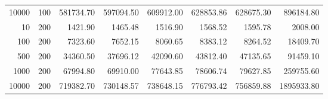 \begin{table}[ht]
\begin{tabular}{rrrrrrrr}
  10000 & 100 & 581734.70 & 597094.50 & 609912.00 & 628853.86 & 628675.30 & 896184.80 \\ 
  10 & 200 & 1421.90 & 1465.48 & 1516.90 & 1568.52 & 1595.78 & 2008.00 \\ 
  100 & 200 & 7323.60 & 7652.15 & 8060.65 & 8383.12 & 8264.52 & 18409.70 \\ 
  500 & 200 & 34360.50 & 37696.12 & 42090.60 & 43812.40 & 47135.65 & 91459.10 \\ 
  1000 & 200 & 67994.80 & 69910.00 & 77643.85 & 78606.74 & 79627.85 & 259755.60 \\ 
  10000 & 200 & 719382.70 & 730148.57 & 738648.15 & 776793.42 & 756859.88 & 1895933.80 \\ 
   \hline
\end{tabular}
\end{table}

